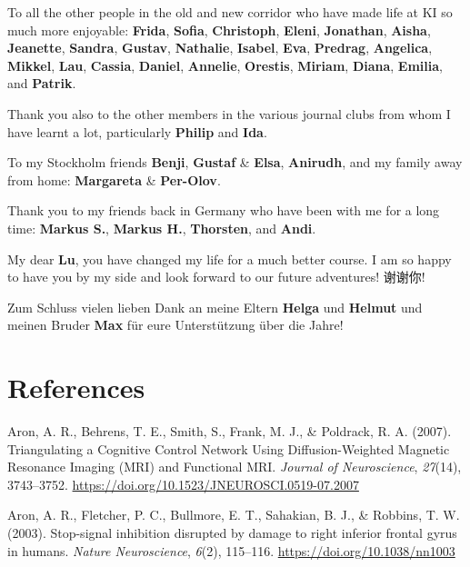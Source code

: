 \documentclass[12pt,openany]{book}
\theoremstyle{definition}
\theoremstyle{definition}
\theoremstyle{definition}
\theoremstyle{remark}
\begin{document}
To all the other people in the old and new corridor who have made life
at KI so much more enjoyable: \textbf{Frida}, \textbf{Sofia},
\textbf{Christoph}, \textbf{Eleni}, \textbf{Jonathan}, \textbf{Aisha},
\textbf{Jeanette}, \textbf{Sandra}, \textbf{Gustav}, \textbf{Nathalie},
\textbf{Isabel}, \textbf{Eva}, \textbf{Predrag}, \textbf{Angelica},
\textbf{Mikkel}, \textbf{Lau}, \textbf{Cassia}, \textbf{Daniel},
\textbf{Annelie}, \textbf{Orestis}, \textbf{Miriam}, \textbf{Diana},
\textbf{Emilia}, and \textbf{Patrik}.

Thank you also to the other members in the various journal clubs from
whom I have learnt a lot, particularly \textbf{Philip} and \textbf{Ida}.

To my Stockholm friends \textbf{Benji}, \textbf{Gustaf} \&
\textbf{Elsa}, \textbf{Anirudh}, and my family away from home:
\textbf{Margareta} \& \textbf{Per-Olov}.

Thank you to my friends back in Germany who have been with me for a long
time: \textbf{Markus S.}, \textbf{Markus H.}, \textbf{Thorsten}, and
\textbf{Andi}.

\begin{CJK}{UTF8}{gbsn}My dear \textbf{Lu}, you have changed my life for a much better course. I am so happy to have you by my side and look forward to our future adventures! 谢谢你!\end{CJK}

Zum Schluss vielen lieben Dank an meine Eltern \textbf{Helga} und
\textbf{Helmut} und meinen Bruder \textbf{Max} für eure Unterstützung
über die Jahre!

\chapter*{References}\label{references}

\hypertarget{refs}{}
\hypertarget{ref-Aron2007a}{}
Aron, A. R., Behrens, T. E., Smith, S., Frank, M. J., \& Poldrack, R. A.
(2007). Triangulating a Cognitive Control Network Using
Diffusion-Weighted Magnetic Resonance Imaging (MRI) and Functional MRI.
\emph{Journal of Neuroscience}, \emph{27}(14), 3743--3752.
\url{https://doi.org/10.1523/JNEUROSCI.0519-07.2007}

\hypertarget{ref-Aron2003}{}
Aron, A. R., Fletcher, P. C., Bullmore, E. T., Sahakian, B. J., \&
Robbins, T. W. (2003). Stop-signal inhibition disrupted by damage to
right inferior frontal gyrus in humans. \emph{Nature Neuroscience},
\emph{6}(2), 115--116. \url{https://doi.org/10.1038/nn1003}
\end{document}
